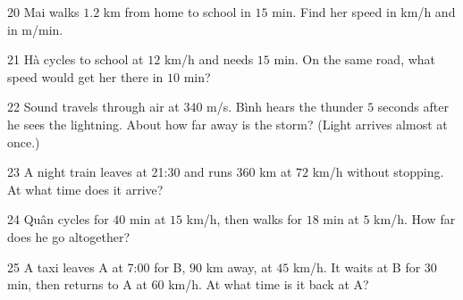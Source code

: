 \gap
\begin{probbox}{20}{\relax}
Mai walks $1.2$ km from home to school in $15$ min. Find her speed in km/h and in m/min.
\end{probbox}
\gap
\begin{probbox}{21}{\relax}
Hà cycles to school at $12$ km/h and needs $15$ min. On the same road, what speed would get her there in $10$ min?
\end{probbox}
\gap
\begin{probbox}{22}{\relax}
Sound travels through air at $340$ m/s. Bình hears the thunder $5$ seconds after he sees the lightning. About how far away is the storm? (Light arrives almost at once.)
\end{probbox}
\gap
\begin{probbox}{23}{\relax}
A night train leaves at 21:30 and runs $360$ km at $72$ km/h without stopping. At what time does it arrive?
\end{probbox}
\gap
\begin{probbox}{24}{\relax}
Quân cycles for $40$ min at $15$ km/h, then walks for $18$ min at $5$ km/h. How far does he go altogether?
\end{probbox}
\gap
\begin{probbox}{25}{\relax}
A taxi leaves A at 7:00 for B, $90$ km away, at $45$ km/h. It waits at B for $30$ min, then returns to A at $60$ km/h. At what time is it back at A?
\end{probbox}
